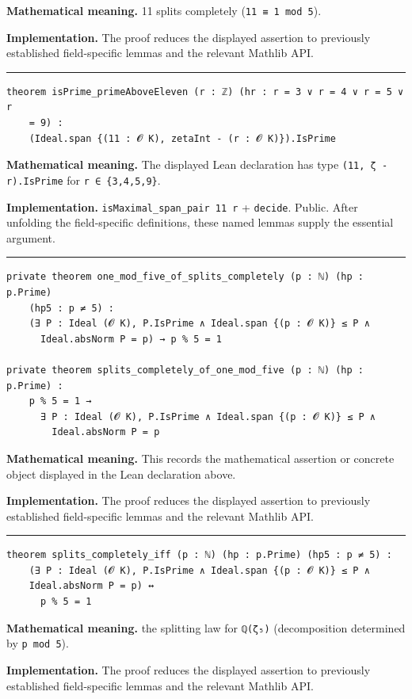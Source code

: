 \documentclass[UTF8,a4paper,11pt,fontset=fandol]{ctexart}
\theoremstyle{definition}
\newcommand{\statementsep}{\par\medskip\hrule\medskip}
\begin{document}
\noindent\textbf{Mathematical meaning.} 11 splits completely (\texttt{11 ≡ 1 mod 5}).\par
\noindent\textbf{Implementation.} The proof reduces the displayed assertion to previously established field-specific lemmas and the relevant Mathlib API.\par
\statementsep
\begin{verbatim}
theorem isPrime_primeAboveEleven (r : ℤ) (hr : r = 3 ∨ r = 4 ∨ r = 5 ∨ r
    = 9) :
    (Ideal.span {(11 : 𝓞 K), zetaInt - (r : 𝓞 K)}).IsPrime
\end{verbatim}
\noindent\textbf{Mathematical meaning.} The displayed Lean declaration has type \texttt{(11, ζ - r).\allowbreak{}IsPrime} for \texttt{r ∈ \{3,4,5,9\}}.\par
\noindent\textbf{Implementation.} \texttt{isMaximal\_\allowbreak{}span\_\allowbreak{}pair 11 r} + \texttt{decide}. Public. After unfolding the field-specific definitions, these named lemmas supply the essential argument.\par
\statementsep
\begin{verbatim}
private theorem one_mod_five_of_splits_completely (p : ℕ) (hp : p.Prime)
    (hp5 : p ≠ 5) :
    (∃ P : Ideal (𝓞 K), P.IsPrime ∧ Ideal.span {(p : 𝓞 K)} ≤ P ∧
      Ideal.absNorm P = p) → p % 5 = 1

private theorem splits_completely_of_one_mod_five (p : ℕ) (hp : p.Prime) :
    p % 5 = 1 →
      ∃ P : Ideal (𝓞 K), P.IsPrime ∧ Ideal.span {(p : 𝓞 K)} ≤ P ∧
        Ideal.absNorm P = p
\end{verbatim}
\noindent\textbf{Mathematical meaning.} This records the mathematical assertion or concrete object displayed in the Lean declaration above.\par
\noindent\textbf{Implementation.} The proof reduces the displayed assertion to previously established field-specific lemmas and the relevant Mathlib API.\par
\statementsep
\begin{verbatim}
theorem splits_completely_iff (p : ℕ) (hp : p.Prime) (hp5 : p ≠ 5) :
    (∃ P : Ideal (𝓞 K), P.IsPrime ∧ Ideal.span {(p : 𝓞 K)} ≤ P ∧
    Ideal.absNorm P = p) ↔
      p % 5 = 1
\end{verbatim}
\noindent\textbf{Mathematical meaning.} the splitting law for \texttt{ℚ(ζ₅)} (decomposition determined by \texttt{p mod 5}).\par
\noindent\textbf{Implementation.} The proof reduces the displayed assertion to previously established field-specific lemmas and the relevant Mathlib API.\par
\end{document}
